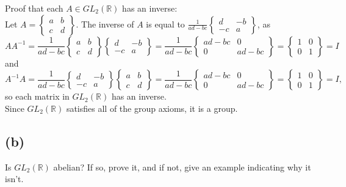 \documentclass[12pt,letterpaper]{article}
\begin{document}
Proof that each \(A \in GL_{2}(\mathbb{R})\) has an inverse: \\
Let \(A = \begin{Bmatrix} a & b \\ c & d \end{Bmatrix}\). The inverse of \(A\) is equal to \(\frac{1}{ad-bc} \begin{Bmatrix} d & -b \\ -c & a \end{Bmatrix}\), as \[AA^{-1} = \frac{1}{ad-bc} \begin{Bmatrix} a & b \\ c & d \end{Bmatrix} \begin{Bmatrix} d & -b \\ -c & a \end{Bmatrix} = \frac{1}{ad-bc} \begin{Bmatrix} ad - bc & 0 \\ 0 & ad-bc \end{Bmatrix} = \begin{Bmatrix} 1 & 0 \\ 0 & 1 \end{Bmatrix} = I \] and \[A^{-1}A = \frac{1}{ad-bc} \begin{Bmatrix} d & -b \\ -c & a \end{Bmatrix} \begin{Bmatrix} a & b \\ c & d \end{Bmatrix} = \frac{1}{ad-bc} \begin{Bmatrix} ad - bc & 0 \\ 0 & ad-bc \end{Bmatrix} = \begin{Bmatrix} 1 & 0 \\ 0 & 1 \end{Bmatrix} = I, \] so each matrix in \(GL_{2}(\mathbb{R})\) has an inverse. \\

Since \(GL_{2}(\mathbb{R})\) satisfies all of the group axioms, it is a group.

\subsection*{(b)}
Is \(GL_{2}(\mathbb{R})\) abelian? If so, prove it, and if not, give an example indicating why it isn't. \\
\end{document}
